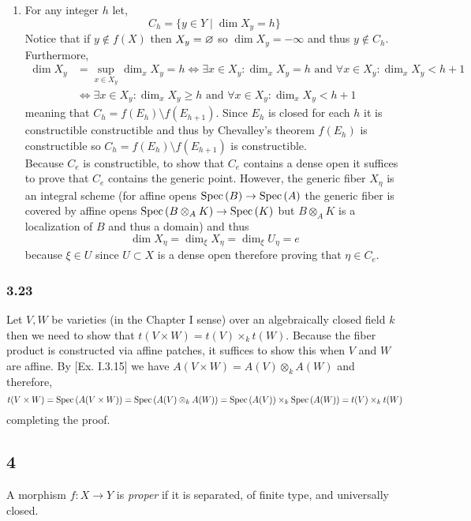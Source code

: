 \documentclass[12pt]{article}
\begin{document}
\begin{enumerate}
\item For any integer $h$ let,
\[ C_h = \{ y \in Y \mid \dim{X_y} = h \} \]
Notice that if $y \notin f(X)$ then $X_y = \varnothing$ so $\dim{X_y} = - \infty$ and thus $y \notin C_h$. Furthermore, 
\begin{align*}
\dim{X_y} & = \sup_{x \in X_y} \dim_x X_y = h \iff \exists x \in X_y : \dim_x{X_y} = h \text{ and } \forall x \in X_y : \dim_x{X_y} < h + 1 \
\\
& \iff \exists x \in X_y : \dim_x{X_y} \ge h \text{ and } \forall x \in X_y : \dim_x{X_y} < h + 1
\end{align*}
meaning that $C_h = f(E_h) \setminus f(E_{h+1})$. Since $E_h$ is closed for each $h$ it is constructible constructible and thus by Chevalley's theorem $f(E_h)$ is constructible so $C_h = f(E_h) \setminus f(E_{h+1})$ is constructible.
\bigskip\\
Because $C_e$ is constructible, to show that $C_e$ contains a dense open it suffices to prove that $C_e$ contains the generic point. However, the generic fiber $X_{\eta}$ is an integral scheme (for affine opens $\mathrm{Spec}\left( B \right) \to \mathrm{Spec}\left( A \right)$ the generic fiber is covered by affine opens $\mathrm{Spec}\left( B \otimes_A K \right) \to \mathrm{Spec}\left( K \right)$ but $B \otimes_A K$ is a localization of $B$ and thus a domain) and thus 
\[ \dim{X_{\eta}} = \dim_{\xi}{X_{\eta}} = \dim_{\xi}{U_{\eta}} = e \]
because $\xi \in U$ since $U \subset X$ is a dense open therefore proving that $\eta \in C_e$.
\end{enumerate}

\subsubsection{3.23}

Let $V, W$ be varieties (in the Chapter I sense) over an algebraically closed field $k$ then we need to show that $t(V \times W) = t(V) \times_k t(W)$. Because the fiber product is constructed via affine patches, it suffices to show this when $V$ and $W$ are affine. By [Ex. I.3.15] we have $A(V \times W) = A(V) \otimes_k A(W)$ and therefore,
\[ t(V \times W) = \mathrm{Spec}\left( A(V \times W) \right) = \mathrm{Spec}\left( A(V) \otimes_k A(W) \right) = \mathrm{Spec}\left( A(V) \right) \times_k \mathrm{Spec}\left( A(W) \right) = t(V) \times_k t(W) \]
completing the proof.

\subsection{4}

\begin{definition}
A morphism $f : X \to Y$ is \textit{proper} if it is separated, of finite type, and universally closed. 
\end{definition}
\end{document}
